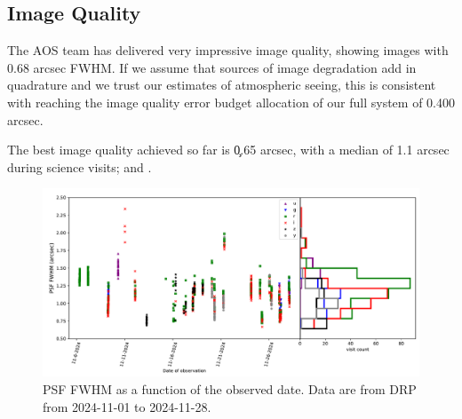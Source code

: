 \subsection{Image Quality}
\label{sec:image_quality}

The AOS team has delivered very impressive image quality, showing images with 0.68 arcsec FWHM. If we assume
that sources of image degradation add in quadrature and we trust our estimates of atmospheric seeing, this is
consistent with reaching the image quality error budget allocation of our full system of 0.400 arcsec.

The best image quality achieved so far is \c 0.65 arcsec, with a median of 1.1 arcsec during science visits;
 and .

\begin{figure}
  \centering
  \includegraphics[width=\textwidth]{figures/seeing}
  \caption{\small PSF FWHM as a function of the observed date. Data are from DRP from 2024-11-01 to 2024-11-28.}
  \label{fig:seeing_plot}
\end{figure}


